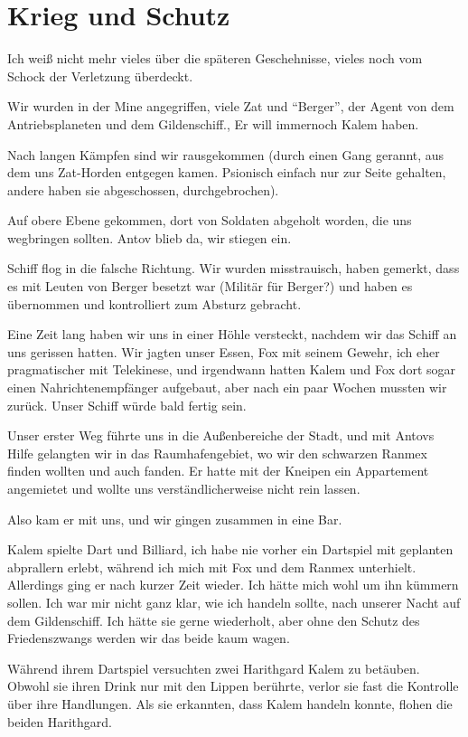 \documentclass[11pt]{scrartcl}
\begin{document}
\section{Krieg und Schutz}

Ich weiß nicht mehr vieles über die späteren Geschehnisse, vieles noch
vom Schock der Verletzung überdeckt.

Wir wurden in der Mine angegriffen, viele Zat und ``Berger'', der Agent
von dem Antriebsplaneten und dem Gildenschiff., Er will immernoch Kalem
haben.

Nach langen Kämpfen sind wir rausgekommen (durch einen Gang gerannt, aus
dem uns Zat-Horden entgegen kamen. Psionisch einfach nur zur Seite
gehalten, andere haben sie abgeschossen, durchgebrochen).

Auf obere Ebene gekommen, dort von Soldaten abgeholt worden, die uns
wegbringen sollten. Antov blieb da, wir stiegen ein.

Schiff flog in die falsche Richtung. Wir wurden misstrauisch, haben
gemerkt, dass es mit Leuten von Berger besetzt war (Militär für Berger?)
und haben es übernommen und kontrolliert zum Absturz gebracht.

Eine Zeit lang haben wir uns in einer Höhle versteckt, nachdem wir das
Schiff an uns gerissen hatten. Wir jagten unser Essen, Fox mit seinem
Gewehr, ich eher pragmatischer mit Telekinese, und irgendwann hatten
Kalem und Fox dort sogar einen Nahrichtenempfänger aufgebaut, aber nach
ein paar Wochen mussten wir zurück. Unser Schiff würde bald fertig sein.

Unser erster Weg führte uns in die Außenbereiche der Stadt, und mit
Antovs Hilfe gelangten wir in das Raumhafengebiet, wo wir den schwarzen
Ranmex finden wollten und auch fanden. Er hatte mit der Kneipen ein
Appartement angemietet und wollte uns verständlicherweise nicht rein
lassen.

Also kam er mit uns, und wir gingen zusammen in eine Bar.

Kalem spielte Dart und Billiard, ich habe nie vorher ein Dartspiel mit
geplanten abprallern erlebt, während ich mich mit Fox und dem Ranmex
unterhielt. Allerdings ging er nach kurzer Zeit wieder. Ich hätte mich
wohl um ihn kümmern sollen. Ich war mir nicht ganz klar, wie ich handeln
sollte, nach unserer Nacht auf dem Gildenschiff. Ich hätte sie gerne
wiederholt, aber ohne den Schutz des Friedenszwangs werden wir das beide
kaum wagen.

Während ihrem Dartspiel versuchten zwei Harithgard Kalem zu betäuben.
Obwohl sie ihren Drink nur mit den Lippen berührte, verlor sie fast die
Kontrolle über ihre Handlungen. Als sie erkannten, dass Kalem handeln
konnte, flohen die beiden Harithgard.
\end{document}
